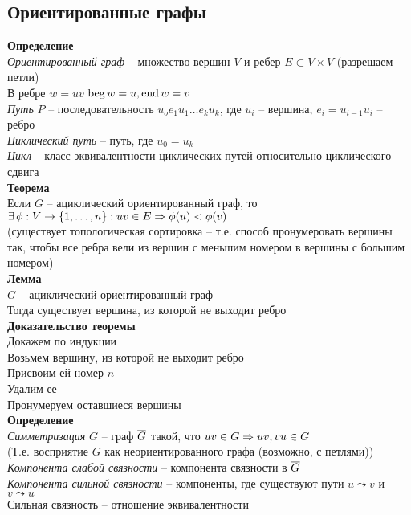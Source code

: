 \documentclass[12pt]{article}
\begin{document}
\subsection{Ориентированные графы}
\textbf{Определение}\\
\textit{Ориентированный граф} -- множество вершин $V$ и ребер $E \subset V \times V$ (разрешаем петли)\\
В ребре $w = uv$ $\operatorname{beg} w = u, \operatorname{end} w = v$\\
\textit{Путь} $P$ -- последовательность $u_oe_1u_1\ldots e_ku_k$, где $u_i$ -- вершина, $e_i = u_{i-1}u_i$ -- ребро\\
\textit{Циклический путь} -- путь, где $u_0 = u_k$\\
\textit{Цикл} -- класс эквивалентности циклических путей относительно циклического сдвига\\
\textbf{Теорема}\\
Если $G$ -- ациклический ориентированный граф, то $\exists\, \phi: V \rightarrow \{1,\ldots, n\}: uv\in E \Rightarrow \phi(u) < \phi(v)$\\
(существует топологическая сортировка -- т.е. способ пронумеровать вершины так, чтобы все ребра вели из вершин с меньшим номером в вершины с большим номером)\\
\textbf{Лемма}\\
$G$ -- ациклический ориентированный граф\\
Тогда существует вершина, из которой не выходит ребро\\
\textbf{Доказательство теоремы}\\
Докажем по индукции\\
Возьмем вершину, из которой не выходит ребро\\
Присвоим ей номер $n$\\
Удалим ее\\
Пронумеруем оставшиеся вершины\\
\textbf{Определение}\\
\textit{Симметризация} $G$ -- граф $\overline{G}$ такой, что $uv \in G \Rightarrow uv,vu \in \overline{G}$\\
(Т.е. восприятие $G$ как неориентированного графа (возможно, с петлями))\\
\textit{Компонента слабой связности} -- компонента связности в $\overline G$\\
\textit{Компонента сильной связности} -- компоненты, где существуют пути $u \leadsto v$ и $v \leadsto u$\\
Сильная связность -- отношение эквивалентности\\
\end{document}
